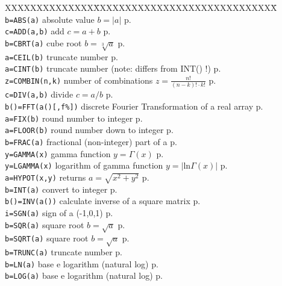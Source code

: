 \begin{tabbing}
XXXXXXXXXXXXXX\=XXXXXXXXXXXXXXXXXXXXXXXXXXXXX\=\kill\\
\verb|b=ABS(a)|		\> absolute value $b=|a|$\> p.\pageref{ABS}\\
\verb|c=ADD(a,b)|	\> add $c=a+b$\> p.\pageref{ADD}\\
\verb|b=CBRT(a)|	\> cube root $b=\sqrt[3]{a}$\> p.\pageref{CBRT}\\
\verb|a=CEIL(b)|	\> truncate number \> p.\pageref{CEIL}\\
\verb|a=CINT(b)|	\> truncate number (note: differs from INT() !)\> p.\pageref{CINT}\\
\verb|z=COMBIN(n,k)| \> number of combinations $z=\frac{n!}{(n-k)!\cdot k!}$\> p.\pageref{COMBIN}\\
\verb|c=DIV(a,b)| \> divide $c=a/b$ \> p.\pageref{DIV}\\
\verb|b()=FFT(a()[,f%])| \> discrete Fourier Transformation  of a real array\> p.\pageref{FFT}\\
\verb|a=FIX(b)|	\> round number to integer \> p.\pageref{FIX}\\
\verb|a=FLOOR(b)|	\> round number down to integer \> p.\pageref{FLOOR}\\
\verb|b=FRAC(a)|	\> fractional (non-integer) part of a \> p.\pageref{FRAC}\\
\verb|y=GAMMA(x)|       \> gamma function $y=\Gamma(x)$ \> p.\pageref{GAMMA}\\
\verb|y=LGAMMA(x)|       \> logarithm of gamma function $y=|\mathrm{ln}\Gamma(x)|$ \> p.\pageref{LGAMMA}\\
\verb|a=HYPOT(x,y)|	\>returns $a=\sqrt{x^2+y^2}$ \> p.\pageref{HYPOT}\\
\verb|b=INT(a)|		\> convert to integer \> p.\pageref{INT}\\
\verb|b()=INV(a())|\> calculate inverse of a square matrix\> p.\pageref{INV} \\
\verb|i=SGN(a)|		\> sign of a (-1,0,1) \> p.\pageref{SGN}\\
\verb|b=SQR(a)|		\> square root $b=\sqrt{a}$\> p.\pageref{SQR}\\
\verb|b=SQRT(a)|	\> square root $b=\sqrt{a}$\> p.\pageref{SQRT}\\
\verb|b=TRUNC(a)|	\> truncate number \> p.\pageref{TRUNC}\\
\verb|b=LN(a)| 		\> base e logarithm (natural log) \> p.\pageref{LN}\\
\verb|b=LOG(a)|		\> base e logarithm (natural log) \> p.\pageref{LOG}\\

\end{tabbing}
